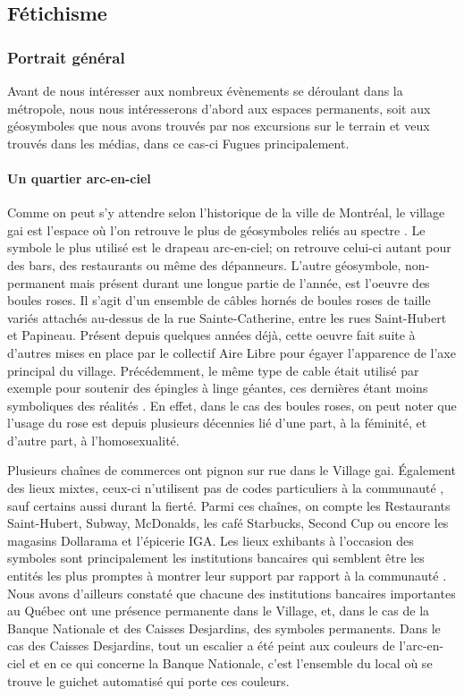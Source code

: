 \subsection{Fétichisme}
\subsubsection{Portrait général}
\label{subsec:portraitgeneralmtl}
Avant de nous intéresser aux nombreux évènements se déroulant dans la métropole, nous nous intéresserons d'abord aux espaces permanents, soit aux géosymboles que nous avons trouvés par nos excursions sur le terrain et veux trouvés dans les médias, dans ce cas-ci Fugues principalement.

\paragraph{Un quartier arc-en-ciel}
Comme on peut s'y attendre selon l'historique de la ville de Montréal, le village gai est l'espace où l'on retrouve le plus de géosymboles reliés au spectre \lgbt{}.
Le symbole le plus utilisé est le drapeau arc-en-ciel; on retrouve celui-ci autant pour des bars, des restaurants ou même des dépanneurs.
L'autre géosymbole, non-permanent mais présent durant une longue partie de l'année, est l'oeuvre des boules roses.
Il s'agit d'un ensemble de câbles hornés de boules roses de taille variés attachés au-dessus de la rue Sainte-Catherine, entre les rues Saint-Hubert et Papineau.
Présent depuis quelques années déjà, cette oeuvre fait suite à d'autres mises en place par le collectif Aire Libre pour égayer l'apparence de l'axe principal du village.
Précédemment, le même type de cable était utilisé par exemple pour soutenir des épingles à linge géantes, ces dernières étant moins symboliques des réalités \lgbt{}.
En effet, dans le cas des boules roses, on peut noter que l'usage du rose est depuis plusieurs décennies lié d'une part, à la féminité, et d'autre part, à l'homosexualité.

Plusieurs chaînes de commerces ont pignon sur rue dans le Village gai.
Également des lieux mixtes, ceux-ci n'utilisent pas de codes particuliers à la communauté \lgbt, sauf certains aussi durant la fierté.
Parmi ces chaînes, on compte les Restaurants Saint-Hubert, Subway, McDonalds, les café Starbucks, Second Cup ou encore les magasins Dollarama et l'épicerie IGA.
Les lieux exhibants à l'occasion des symboles sont principalement les institutions bancaires qui semblent être les entités les plus promptes à montrer leur support par rapport à la communauté \lgbt.
Nous avons d'ailleurs constaté que chacune des institutions bancaires importantes au Québec ont une présence permanente dans le Village, et, dans le cas de la Banque Nationale et des Caisses Desjardins, des symboles \lgbt{} permanents.
Dans le cas des Caisses Desjardins, tout un escalier a été peint aux couleurs de l'arc-en-ciel et en ce qui concerne la Banque Nationale, c'est l'ensemble du local où se trouve le guichet automatisé qui porte ces couleurs.

